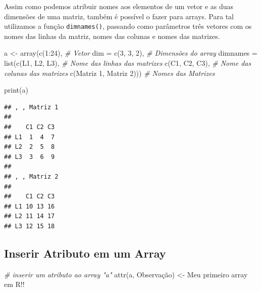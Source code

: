 \documentclass[
]{article}
\newenvironment{Shaded}{\begin{snugshade}}{\end{snugshade}}
\newcommand{\AttributeTok}[1]{\textcolor[rgb]{0.77,0.63,0.00}{#1}}
\newcommand{\CommentTok}[1]{\textcolor[rgb]{0.56,0.35,0.01}{\textit{#1}}}
\newcommand{\DecValTok}[1]{\textcolor[rgb]{0.00,0.00,0.81}{#1}}
\newcommand{\FunctionTok}[1]{\textcolor[rgb]{0.00,0.00,0.00}{#1}}
\newcommand{\NormalTok}[1]{#1}
\newcommand{\OtherTok}[1]{\textcolor[rgb]{0.56,0.35,0.01}{#1}}
\newcommand{\SpecialCharTok}[1]{\textcolor[rgb]{0.00,0.00,0.00}{#1}}
\newcommand{\StringTok}[1]{\textcolor[rgb]{0.31,0.60,0.02}{#1}}
\begin{document}
Assim como podemos atribuir nomes aos elementos de um vetor e as duas
dimensões de uma matriz, também é possível o fazer para arrays. Para tal
utilizamos a função \texttt{dimnames()}, passando como parâmetros três
vetores com os nomes das linhas da matriz, nomes das colunas e nomes das
matrizes.

\begin{Shaded}
\begin{Highlighting}[]
\NormalTok{a }\OtherTok{\textless{}{-}} \FunctionTok{array}\NormalTok{(}\FunctionTok{c}\NormalTok{(}\DecValTok{1}\SpecialCharTok{:}\DecValTok{24}\NormalTok{),  }\CommentTok{\# Vetor}
           \AttributeTok{dim =} \FunctionTok{c}\NormalTok{(}\DecValTok{3}\NormalTok{, }\DecValTok{3}\NormalTok{, }\DecValTok{2}\NormalTok{),  }\CommentTok{\# Dimensões do array }
           \AttributeTok{dimnames =} \FunctionTok{list}\NormalTok{(}\FunctionTok{c}\NormalTok{(}\StringTok{\textquotesingle{}L1\textquotesingle{}}\NormalTok{, }\StringTok{\textquotesingle{}L2\textquotesingle{}}\NormalTok{, }\StringTok{\textquotesingle{}L3\textquotesingle{}}\NormalTok{),  }\CommentTok{\# Nome das linhas das matrizes}
                           \FunctionTok{c}\NormalTok{(}\StringTok{\textquotesingle{}C1\textquotesingle{}}\NormalTok{, }\StringTok{\textquotesingle{}C2\textquotesingle{}}\NormalTok{, }\StringTok{\textquotesingle{}C3\textquotesingle{}}\NormalTok{),  }\CommentTok{\# Nome das colunas das matrizes}
                           \FunctionTok{c}\NormalTok{(}\StringTok{\textquotesingle{}Matriz 1\textquotesingle{}}\NormalTok{, }\StringTok{\textquotesingle{}Matriz 2\textquotesingle{}}\NormalTok{)))  }\CommentTok{\# Nomes das Matrizes}

\FunctionTok{print}\NormalTok{(a)}
\end{Highlighting}
\end{Shaded}

\begin{verbatim}
## , , Matriz 1
## 
##    C1 C2 C3
## L1  1  4  7
## L2  2  5  8
## L3  3  6  9
## 
## , , Matriz 2
## 
##    C1 C2 C3
## L1 10 13 16
## L2 11 14 17
## L3 12 15 18
\end{verbatim}

\hypertarget{inserir-atributo-em-um-array}{%
\subsection{Inserir Atributo em um
Array}\label{inserir-atributo-em-um-array}}

\begin{Shaded}
\begin{Highlighting}[]
\CommentTok{\# inserir um atributo ao array "a"}
\FunctionTok{attr}\NormalTok{(a, }\StringTok{\textquotesingle{}Observação\textquotesingle{}}\NormalTok{) }\OtherTok{\textless{}{-}} \StringTok{\textquotesingle{}Meu primeiro array em R!!\textquotesingle{}}
\end{Highlighting}
\end{Shaded}
\end{document}
